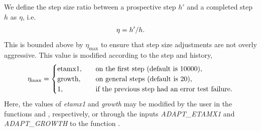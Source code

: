 \documentclass[letterpaper,10pt,english]{sphinxmanual}
\begin{document}
We define the step size ratio between a prospective step \(h'\)
and a completed step \(h\) as \(\eta\), i.e.
\begin{gather}
\begin{split}\eta = h' / h.\end{split}\notag
\end{gather}
This is bounded above by \(\eta_\text{max}\) to ensure that step size
adjustments are not overly aggressive.  This value is modified
according to the step and history,
\begin{gather}
\begin{split}\eta_\text{max} = \begin{cases}
  \text{etamx1}, & \quad\text{on the first step (default is 10000)}, \\
  \text{growth}, & \quad\text{on general steps (default is 20)}, \\
  1, & \quad\text{if the previous step had an error test failure}.
\end{cases}\end{split}\notag
\end{gather}
Here, the values of \emph{etamx1} and \emph{growth} may be modified by the user
in the functions {\hyperref[c_interface/User_callable:c.ARKodeSetMaxFirstGrowth]{\emph{}}} and
{\hyperref[c_interface/User_callable:c.ARKodeSetMaxGrowth]{\emph{}}}, respectively, or through the inputs
\emph{ADAPT\_ETAMX1} and \emph{ADAPT\_GROWTH} to the function
{\hyperref[f_interface/Usage:f/_/FARKSETRIN]{\emph{}}}.
\end{document}
